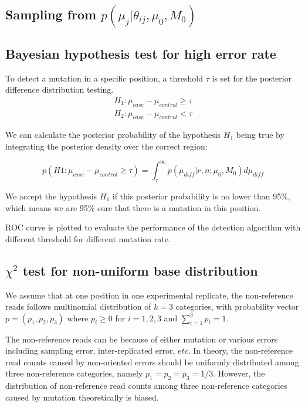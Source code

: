 \documentclass[11pt,reqno]{amsart}
\begin{document}
\subsection{Sampling from $p \left( \mu_j |\theta_{ij},\mu_0,M_0\right)$}

\subsection{Bayesian hypothesis test for high error rate}

To detect a mutation in a specific position, a threshold $\tau$ is set for the posterior difference distribution testing.
\begin{align}
 H_1: \mu_{case}-\mu_{control}\geq\tau \\
 H_2: \mu_{case}-\mu_{control}<\tau
\end{align}

We can calculate the posterior probability of the hypothesis $H_1$ being true by integrating the posterior density over the correct region:

\begin{equation}
 p(H1:\mu_{case}-\mu_{control}\geq\tau)=\int_\tau^\infty p(\mu_{diff} |r,n; \mu_0,M_0)d\mu_{diff}
\end{equation}

We accept the hypothesis $H_1$ if this posterior probability is no lower than 95\%, which means we are 95\% sure that there is a mutation in this position.

ROC curve is plotted to evaluate the performance of the detection algorithm with different threshold for different mutation rate. 


\subsection{$\chi^2$ test for non-uniform base distribution}

We assume that at one position in one experimental replicate, the non-reference reads follows multinomial distribution of $k = 3$ categories, with probability vector $p = (p_1, p_2, p_3)$ where $p_i \geq 0$ for $i =1, 2, 3$ and $\sum_{i=1}^3 p_i = 1$.

The non-reference reads can be because of either mutation or various errors including sampling error, inter-replicated error, $etc$. In theory, the non-reference read counts caused by non-oriented errors should be uniformly distributed among three non-reference categories, namely $p_1=p_2=p_3=1/3$. However, the distribution of non-reference read counts among three non-reference categories caused by mutation theoretically is biased. 
\end{document}
